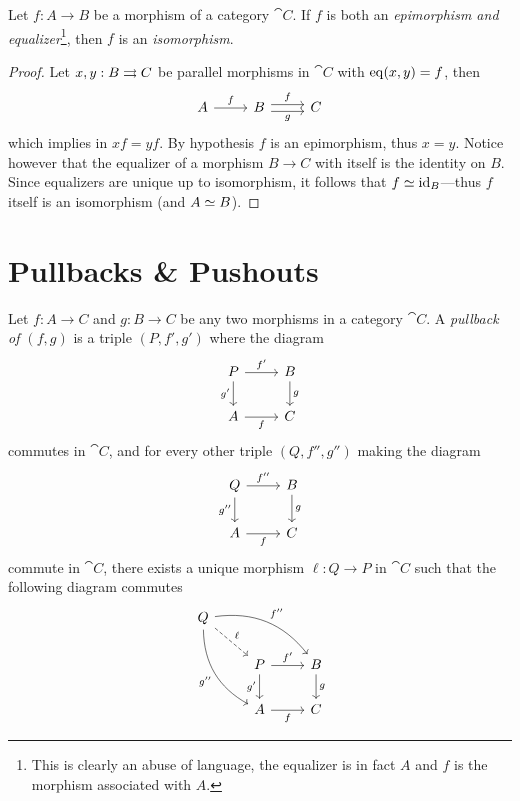 \begin{proposition}
\label{prop:epi-and-eq-is-iso}
Let \(f: A \to B\) be a morphism of a category \(\cat C\). If \(f\) is both an
\emph{epimorphism and equalizer}\footnote{This is clearly an abuse of language,
  the equalizer is in fact \(A\) and \(f\) is the morphism associated with
  \(A\).}, then \(f\) is an \emph{isomorphism}.
\end{proposition}

\begin{proof}
Let \(x, y: B \rightrightarrows C\) be parallel morphisms in \(\cat C\) with \(\operatorname{eq}(x, y) =
f\), then
\[
\begin{tikzcd}
A \ar[r, "f"] & B \ar[r, shift right, "g"'] \ar[r, shift left, "f"] &C
\end{tikzcd}
\]
which implies in \(x f = y f\). By hypothesis \(f\) is an epimorphism, thus
\(x = y\). Notice however that the equalizer of a morphism \(B \to C\) with
itself is the identity on \(B\). Since equalizers are unique up to isomorphism,
it follows that \(f \simeq \operatorname{id}_B\)---thus \(f\) itself is an isomorphism (and
\(A \simeq B\)).
\end{proof}

\section{Pullbacks \& Pushouts}

\begin{definition}[Pullback]
\label{def:pullback}
Let \(f: A \to C\) and \(g: B \to C\) be any two morphisms in a category
\(\cat C\). A \emph{pullback of \((f, g)\)} is a triple \((P, f', g')\)
where the diagram
\[
\begin{tikzcd}
P \ar[r, "f'"] \ar[d, "g'"'] &B \ar[d, "g"]
\\
A \ar[r, "f"'] &C
\end{tikzcd}
\]
commutes in \(\cat C\), and for every other triple \((Q, f'', g'')\) making the
diagram
\[
\begin{tikzcd}
Q \ar[r, "f''"] \ar[d, "g''"'] &B \ar[d, "g"]
\\
A \ar[r, "f"'] &C
\end{tikzcd}
\]
commute in \(\cat C\), there exists a unique morphism \(\ell: Q \to P\) in
\(\cat C\) such that the following diagram commutes
\[
\begin{tikzcd}
Q \ar[dr, dashed, "\ell"]
\ar[rrd, bend left, "f''"]
\ar[drd, bend right, "g''"']
& &
\\
&P \ar[r, "f'"] \ar[d, "g'"'] &B \ar[d, "g"]
\\
&A \ar[r, "f"'] &C
\end{tikzcd}
\]
\end{definition}

